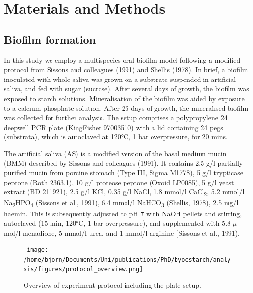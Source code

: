 \documentclass[
]{article}
\begin{document}
\hypertarget{materials-and-methods}{%
\section{Materials and Methods}\label{materials-and-methods}}

\hypertarget{biofilm-formation}{%
\subsection{Biofilm formation}\label{biofilm-formation}}

In this study we employ a multispecies oral biofilm model following a modified
protocol from Sissons and colleagues (1991) and
Shellis (1978). In brief, a biofilm inoculated
with whole saliva was grown on a substrate suspended in artificial saliva, and
fed with sugar (sucrose). After several days of growth, the biofilm was exposed
to starch solutions. Mineralisation of the biofilm was aided by exposure to a
calcium phosphate solution. After 25 days of growth, the mineralised biofilm was
collected for further analysis. The setup comprises a polypropylene
24 deepwell PCR plate (KingFisher 97003510) with a lid containing 24 pegs (substrata), which
is autoclaved at 120°C, 1 bar overpressure, for 20 mins.

The artificial saliva (AS) is a modified version of the basal medium mucin (BMM)
described by Sissons and colleagues (1991).
It contains 2.5 g/l partially purified mucin from porcine stomach (Type III, Sigma M1778),
5 g/l trypticase peptone (Roth 2363.1), 10 g/l proteose peptone (Oxoid LP0085),
5 g/l yeast extract (BD 211921), 2.5 g/l KCl, 0.35 g/l NaCl, 1.8 mmol/l CaCl\textsubscript{2},
5.2 mmol/l Na\textsubscript{2}HPO\textsubscript{4} (Sissons et al., 1991), 6.4 mmol/l NaHCO\textsubscript{3}
(Shellis, 1978), 2.5 mg/l haemin. This is subsequently
adjusted to pH 7 with NaOH pellets and stirring, autoclaved (15 min, 120°C,
1 bar overpressure), and supplemented with 5.8 \(\mu\)mol/l menadione, 5 mmol/l urea,
and 1 mmol/l arginine (Sissons et al., 1991).

\begin{figure}
\centering
\texttt{[image: /home/bjorn/Documents/Uni/publications/PhD/byocstarch/analysis/figures/protocol\_overview.png]}
\caption{\label{fig:protocol-fig}Overview of experiment protocol including the plate setup.}
\end{figure}
\end{document}
